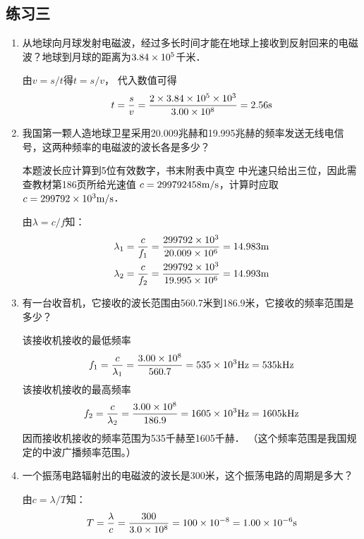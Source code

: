 \subsection{练习三}
\begin{enumerate}
	\item 从地球向月球发射电磁波，经过多长时间才能在地球上接收到反射回来的电磁波？地球到月球的距离为$3.84\times10^5$千米．

    \begin{solution}
由$v=s/t$得$t=s/v$，  代入数值可得
\[t=\frac{s}{v}=\frac{2\times 3.84\times10^5\times 10^3}{3.00\times 10^8}=2.56{\rm s}\]
    \end{solution}
    
	\item 我国第一颗人造地球卫星采用20.009兆赫和19.995兆赫的频率发送无线电信号，这两种频率的电磁波的波长各是多少？

    \begin{solution}
        本题波长应计算到5位有效数字，书末附表中真空
        中光速只给出三位，因此需查教材第186页所给光速值
        $c=299792458\text{m}/\text{s}$，计算时应取$c=299792\times10^3\text{m}/\text{s}$．

由$\lambda=c/f$知：
\[\begin{split}
\lambda_1&=\frac{c}{f_1}=\frac{299792\times10^3}{20.009\times 10^6}=14.983{\rm m}\\
\lambda_2&=\frac{c}{f_2}=\frac{299792\times10^3}{19.995\times 10^6}=14.993{\rm m}\\
\end{split}\]
    \end{solution}
    
	\item 有一台收音机，它接收的波长范围由560.7米到186.9米，它接收的频率范围是多少？

    \begin{solution}
该接收机接收的最低频率
\[f_1=\frac{c}{\lambda_1}=\frac{3.00\times10^8}{560.7}=535\times 10^3{\rm Hz}=535{\rm kHz}\]
该接收机接收的最高频率
\[f_2=\frac{c}{\lambda_2}=\frac{3.00\times10^8}{186.9}=1605\times 10^3{\rm Hz}=1605{\rm kHz}\]
因而接收机接收的频率范围为535千赫至1605千赫．
（这个频率范围是我国规定的中波广播频率范围。）
    \end{solution}
    
	\item 一个振荡电路辐射出的电磁波的波长是300米，这个振荡电路的周期是多大？

    \begin{solution}
由$c=\lambda/T$知：
\[T=\frac{\lambda}{c}=\frac{300}{3.0\times 10^8}=100\times 10^{-8}=1.00\times 10^{-6}{\rm s}\]
    \end{solution}
    
\end{enumerate}



